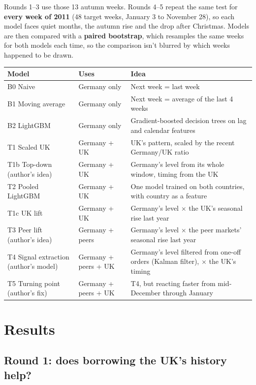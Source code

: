 \documentclass[11pt]{article}
\begin{document}
Rounds 1--3 use those 13 autumn weeks. Rounds 4--5 repeat the same test for \textbf{every week of 2011}
(48 target weeks, January 3 to November 28), so each model faces quiet months, the autumn rise and the drop
after Christmas. Models are then compared with a \textbf{paired bootstrap}, which resamples the same weeks
for both models each time, so the comparison isn't blurred by which weeks happened to be drawn.

\begin{center}
\begin{tabularx}{\textwidth}{l l L}
\toprule
Model & Uses & Idea \\
\midrule
B0 Naive & Germany only & Next week = last week \\
B1 Moving average & Germany only & Next week = average of the last 4 weeks \\
B2 LightGBM & Germany only & Gradient-boosted decision trees on lag and calendar features \\
T1 Scaled UK & Germany + UK & UK's pattern, scaled by the recent Germany/UK ratio \\
T1b Top-down (author's idea) & Germany + UK & Germany's level from its whole window, timing from the UK \\
T2 Pooled LightGBM & Germany + UK & One model trained on both countries, with country as a feature \\
T1c UK lift & Germany + UK & Germany's level $\times$ the UK's seasonal rise last year \\
T3 Peer lift (author's idea) & Germany + peers & Germany's level $\times$ the peer markets' seasonal rise last year \\
T4 Signal extraction (author's model) & Germany + peers + UK & Germany's level filtered from one-off orders
(Kalman filter), $\times$ the UK's timing \\
T5 Turning point (author's fix) & Germany + peers + UK & T4, but reacting faster from mid-December
through January \\
\bottomrule
\end{tabularx}
\end{center}

\section{Results}

\subsection*{Round 1: does borrowing the UK's history help?}
\end{document}
